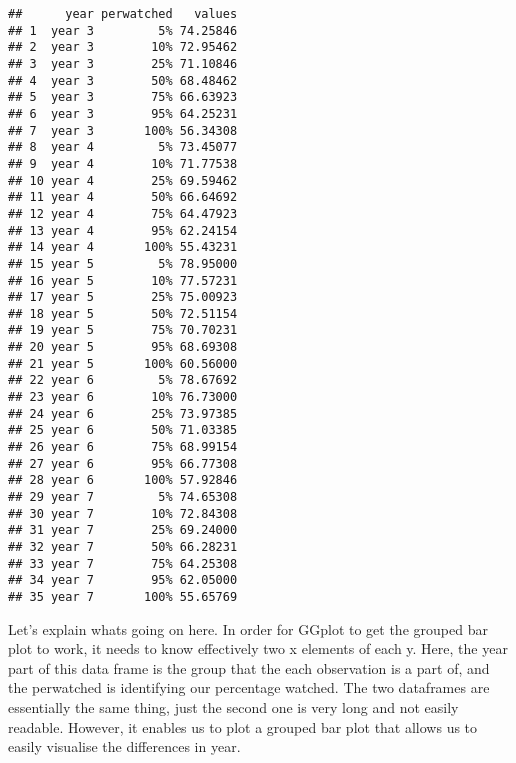 \documentclass[
]{article}
\newenvironment{Shaded}{\begin{snugshade}}{\end{snugshade}}
\newcommand{\DataTypeTok}[1]{\textcolor[rgb]{0.13,0.29,0.53}{#1}}
\newcommand{\KeywordTok}[1]{\textcolor[rgb]{0.13,0.29,0.53}{\textbf{#1}}}
\newcommand{\NormalTok}[1]{#1}
\newcommand{\OperatorTok}[1]{\textcolor[rgb]{0.81,0.36,0.00}{\textbf{#1}}}
\newcommand{\StringTok}[1]{\textcolor[rgb]{0.31,0.60,0.02}{#1}}
\begin{document}
\begin{verbatim}
##      year perwatched   values
## 1  year 3         5% 74.25846
## 2  year 3        10% 72.95462
## 3  year 3        25% 71.10846
## 4  year 3        50% 68.48462
## 5  year 3        75% 66.63923
## 6  year 3        95% 64.25231
## 7  year 3       100% 56.34308
## 8  year 4         5% 73.45077
## 9  year 4        10% 71.77538
## 10 year 4        25% 69.59462
## 11 year 4        50% 66.64692
## 12 year 4        75% 64.47923
## 13 year 4        95% 62.24154
## 14 year 4       100% 55.43231
## 15 year 5         5% 78.95000
## 16 year 5        10% 77.57231
## 17 year 5        25% 75.00923
## 18 year 5        50% 72.51154
## 19 year 5        75% 70.70231
## 20 year 5        95% 68.69308
## 21 year 5       100% 60.56000
## 22 year 6         5% 78.67692
## 23 year 6        10% 76.73000
## 24 year 6        25% 73.97385
## 25 year 6        50% 71.03385
## 26 year 6        75% 68.99154
## 27 year 6        95% 66.77308
## 28 year 6       100% 57.92846
## 29 year 7         5% 74.65308
## 30 year 7        10% 72.84308
## 31 year 7        25% 69.24000
## 32 year 7        50% 66.28231
## 33 year 7        75% 64.25308
## 34 year 7        95% 62.05000
## 35 year 7       100% 55.65769
\end{verbatim}

\begin{Shaded}
\end{Shaded}

Let's explain whats going on here. In order for GGplot to get the
grouped bar plot to work, it needs to know effectively two x elements of
each y. Here, the year part of this data frame is the group that the
each observation is a part of, and the perwatched is identifying our
percentage watched. The two dataframes are essentially the same thing,
just the second one is very long and not easily readable. However, it
enables us to plot a grouped bar plot that allows us to easily visualise
the differences in year.
\end{document}
